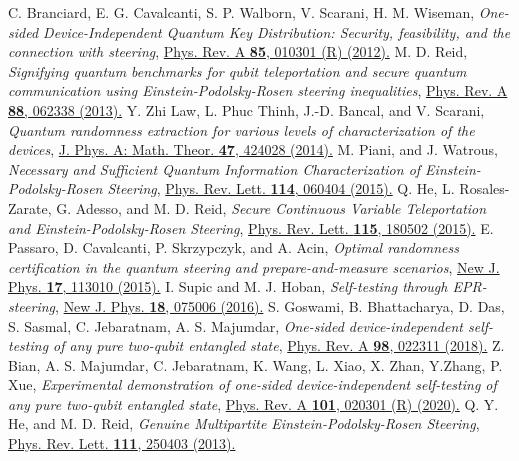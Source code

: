 \documentclass[pra,a4paper,aps,twocolumn,showpacs,superscriptaddress,groupedaddress]{revtex4}
\begin{document}
\begin{thebibliography}{1}
 C. Branciard, E. G. Cavalcanti, S. P. Walborn, V. Scarani, H. M. Wiseman, \emph{One-sided Device-Independent Quantum Key Distribution: Security, feasibility, and the connection with steering}, \href{https://journals.aps.org/pra/abstract/10.1103/PhysRevA.85.010301}{Phys. Rev. A {\bf 85}, 010301 (R) (2012).}
 M. D. Reid, \emph{Signifying quantum benchmarks for qubit teleportation and secure quantum communication using Einstein-Podolsky-Rosen steering inequalities}, \href{https://journals.aps.org/pra/abstract/10.1103/PhysRevA.88.062338}{Phys. Rev. A {\bf 88}, 062338 (2013).}
 Y. Zhi Law, L. Phuc Thinh, J.-D. Bancal, and V. Scarani, \emph{Quantum randomness extraction for various levels of characterization of the devices}, \href{http://iopscience.iop.org/article/10.1088/1751-8113/47/42/424028/meta}{J. Phys. A: Math. Theor.  {\bf 47}, 424028 (2014).}
  M. Piani, and J. Watrous, \emph{Necessary and Sufficient Quantum Information Characterization of Einstein-Podolsky-Rosen Steering},  \href{https://journals.aps.org/prl/abstract/10.1103/PhysRevLett.114.060404}{Phys. Rev. Lett. {\bf 114}, 060404 (2015).}
 Q. He, L. Rosales-Zarate, G. Adesso, and M. D. Reid, \emph{Secure Continuous Variable Teleportation and Einstein-Podolsky-Rosen Steering}, \href{https://journals.aps.org/prl/abstract/10.1103/PhysRevLett.115.180502}{Phys. Rev. Lett. {\bf 115}, 180502 (2015).}
 E. Passaro, D. Cavalcanti, P. Skrzypczyk, and A. Acin, \emph{Optimal randomness certification in the quantum steering and prepare-and-measure scenarios}, \href{http://iopscience.iop.org/article/10.1088/1367-2630/17/11/113010/meta}{New J. Phys. {\bf 17},
113010 (2015).} 
 I. Supic and M. J. Hoban, \emph{Self-testing through EPR-steering}, \href{https://iopscience.iop.org/article/10.1088/1367-2630/18/7/075006}{New J. Phys. {\bf 18}, 075006 (2016).}
 S. Goswami, B. Bhattacharya, D. Das, S. Sasmal, C. Jebaratnam, A. S. Majumdar, \emph{One-sided device-independent self-testing of any pure two-qubit entangled state}, \href{https://journals.aps.org/pra/abstract/10.1103/PhysRevA.98.022311}{Phys. Rev. A {\bf 98}, 022311 (2018).}
 Z. Bian, A. S. Majumdar, C. Jebaratnam, K. Wang, L. Xiao, X. Zhan, Y.Zhang, P. Xue, \emph{Experimental demonstration of one-sided device-independent self-testing of any pure two-qubit entangled state}, \href{https://journals.aps.org/pra/abstract/10.1103/PhysRevA.101.020301}{Phys. Rev. A {\bf 101}, 020301 (R) (2020).}
 Q. Y. He, and M. D. Reid, \emph{Genuine Multipartite Einstein-Podolsky-Rosen Steering}, \href{https://journals.aps.org/prl/abstract/10.1103/PhysRevLett.111.250403}{Phys. Rev. Lett. \textbf{111}, 250403 (2013).}


\end{thebibliography}
\end{document}
